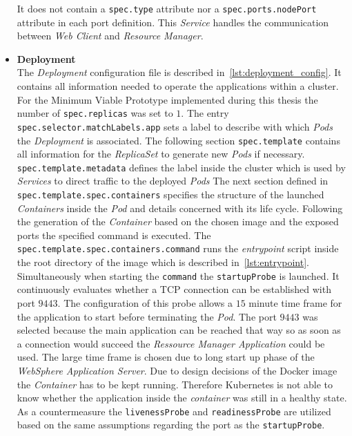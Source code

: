 \begin{itemize}
{    It does not contain a \texttt{spec.type} attribute nor a \texttt{spec.ports.nodePort} attribute in each port definition.
    This \textit{Service} handles the communication between \textit{Web Client} and \textit{Resource Manager}.
    }
    \item[]{\textbf{Deployment}\\
    The \textit{Deployment} configuration file is described in~\cref{lst:deployment_config}.
    It contains all information needed to operate the applications within a cluster.
    For the Minimum Viable Prototype implemented during this thesis the number of \texttt{spec.replicas} was set to $1$.
    The entry \texttt{spec.selector.matchLabels.app} sets a label to describe with which \textit{Pods} the \textit{Deployment} is associated.
    The following section \texttt{spec.template} contains all information for the \textit{ReplicaSet} to generate new \textit{Pods} if necessary.
    \texttt{spec.template.metadata} defines the label inside the cluster which is used by \textit{Services} to direct traffic to the deployed \textit{Pods}
    The next section defined in \texttt{spec.template.spec.containers} specifies the structure of the launched \textit{Containers} inside the \textit{Pod} and details concerned with its life cycle.
    Following the generation of the \textit{Container} based on the chosen image and the exposed ports the specified command is executed.
    The \texttt{spec.template.spec.containers.command} runs the \textit{entrypoint} script inside the root directory of the image which is described in~\cref{lst:entrypoint}.
    Simultaneously when starting the \texttt{command} the \texttt{startupProbe} is launched.
    It continuously evaluates whether a TCP connection can be established with port $9443$.
    The configuration of this probe allows a $15$ minute time frame for the application to start before terminating the \textit{Pod}.
    The port $9443$ was selected because the main application can be reached that way so as soon as a connection would succeed the \textit{Ressource Manager Application} could be used.
    The large time frame is chosen due to long start up phase of the \textit{WebSphere Application Server}.
    Due to design decisions of the Docker image the \textit{Container} has to be kept running.
    Therefore Kubernetes is not able to know whether the application inside the \textit{container} was still in a healthy state.
    As a countermeasure the \texttt{livenessProbe} and \texttt{readinessProbe} are utilized based on the same assumptions regarding the port as the \texttt{startupProbe}.
}
\end{itemize}
